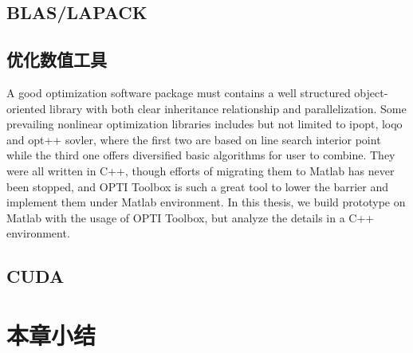 \subsection{BLAS/LAPACK}
\subsection{优化数值工具}
A good optimization software package must contains a well structured object-oriented library with both clear inheritance relationship and
parallelization. Some prevailing nonlinear optimization libraries includes but not limited to ipopt\parencite{ipopt1}, loqo\parencite{vanderbei1999interior} and opt++\parencite{meza2007opt++} sovler, where the first two are based on line search interior point while the third one offers diversified basic algorithms for user to combine. They were all written in C++, though efforts of migrating them to Matlab has never been stopped, and OPTI Toolbox is such a great tool to lower the barrier and implement them under Matlab environment\parencite{CW12a}. In this thesis, we build prototype on Matlab with the usage of OPTI Toolbox, but analyze the details in a C++ environment. 
\subsection{CUDA}
\section{本章小结}